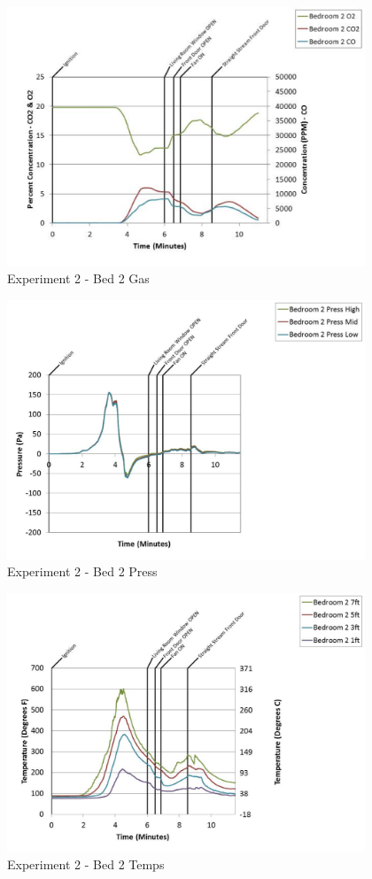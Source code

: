 \documentclass{article}
\begin{document}
\begin{appendices}
	\clearpage

	\begin{figure}[h!]
		\centering
		\includegraphics[height=3.05in]{0_Images/Results_Charts/Exp_2_Charts/Bed2Gas.pdf}
		\caption{Experiment 2 - Bed 2 Gas}
	\end{figure}
 

	\begin{figure}[h!]
		\centering
		\includegraphics[height=3.05in]{0_Images/Results_Charts/Exp_2_Charts/Bed2Press.pdf}
		\caption{Experiment 2 - Bed 2 Press}
	\end{figure}
 
	\clearpage

	\begin{figure}[h!]
		\centering
		\includegraphics[height=3.05in]{0_Images/Results_Charts/Exp_2_Charts/Bed2Temps.pdf}
		\caption{Experiment 2 - Bed 2 Temps}
	\end{figure}
 


\end{appendices}
\end{document}

